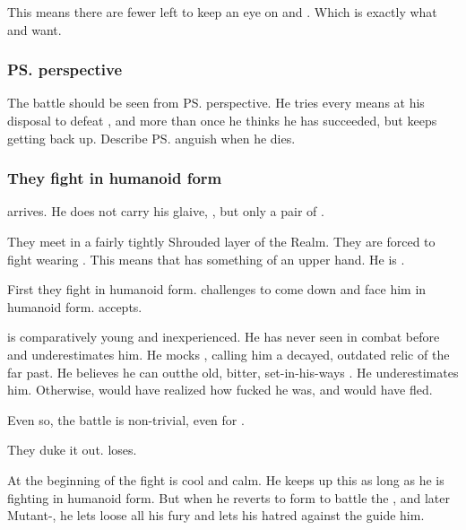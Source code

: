 This means there are fewer \resphain{} left to keep an eye on \Forclin{} and \Malcur. 
Which is exactly what \Ishnaruchaefir{} and \Secherdamon{} want. 





\subsubsection{\ps{\Teshrial} perspective}
The battle should be seen from \ps{\Teshrial} perspective. 
He tries every means at his disposal to defeat \Ishnaruchaefir, and more than once he thinks he has succeeded, but \Ishnaruchaefir{} keeps getting back up. 
Describe \ps{\Teshrial} anguish when he dies. 





\subsubsection{They fight in humanoid form}
\Ishnaruchaefir{} arrives. 
He does not carry his glaive, \Rystessakhin, but only a pair of \skekrathuins. 

They meet in a fairly tightly Shrouded layer of the Realm. 
They are forced to fight wearing . 
This means that \Teshrial{} has something of an upper hand. 
He is . 

First they fight in humanoid form. 
\Teshrial{} challenges \Ishnaruchaefir{} to come down and face him in humanoid form. 
\Ishnaruchaefir{} accepts. 

\Teshrial{} is comparatively young and inexperienced. 
He has never seen \Ishnaruchaefir{} in combat before and underestimates him. 
He mocks \Ishnaruchaefir, calling him a decayed, outdated relic of the far past. 
He believes he can out\manoeuvre the old, bitter, set-in-his-ways \dragon.
He underestimates him. 
Otherwise, \Teshrial{} would have realized how fucked he was, and would have fled. 

Even so, the battle is non-trivial, even for \Ishnaruchaefir. 

They duke it out. 
\Teshrial{} loses. 

At the beginning of the fight \Ishnaruchaefir{} is cool and calm. 
He keeps up this \facade{} as long as he is fighting in humanoid form. 
But when he reverts to \draconian{} form to battle the \noggyaleth{}, and later Mutant-\Teshrial, he lets loose all his \draconian{} fury and lets his hatred against the \resphain{} guide him. 

